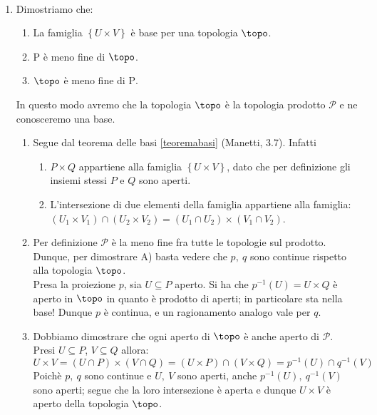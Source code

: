 \begin{demonstration}~{}
	\begin{enumerate}[label=\Roman*]
		\item Dimostriamo che:
		\begin{enumerate}[label=\Alph*)]
			\item La famiglia $\left\{U\times V\right\}$ è base per una topologia $\topo$.
			\item $\mathrm{P}$ è meno fine di $\topo$.
			\item $\topo$ è meno fine di $\mathrm{P}$.
		\end{enumerate}
		In questo modo avremo che la topologia $\topo$ è la topologia prodotto $\mathcal{P}$ e ne conosceremo una base.
		\begin{enumerate}[label=\alph*)]
			\item Segue dal teorema delle basi \ref{teoremabasi} (Manetti, 3.7). Infatti
			\begin{enumerate}
				\item $P\times Q$ appartiene alla famiglia $\left\{U\times V\right\}$, dato che per definizione gli insiemi stessi $P$ e $Q$ sono aperti.
				\item L'intersezione di due elementi della famiglia appartiene alla famiglia:
				$\left(U_1\times V_1\right)\cap\left(U_2\times V_2\right)=\left(U_1\cap U_2\right)\times \left(V_1\cap V_2\right)$.
			\end{enumerate}
			\item Per definizione $\mathcal{P}$ è la meno fine fra tutte le topologie sul prodotto. Dunque, per dimostrare A) basta vedere che $p,\ q$ sono continue rispetto alla topologia $\topo$.\\
			Presa la proiezione $p$, sia $U\subseteq P$ aperto. Si ha che $p^{-1}\left(U\right)=U\times Q$ è aperto in $\topo$ in quanto è prodotto di aperti; in particolare sta nella base! Dunque $p$ è continua, e un ragionamento analogo vale per $q$.
			\item Dobbiamo dimostrare che ogni aperto di $\topo$ è anche aperto di $\mathcal{P}$.\\
			Presi $U\subseteq P$, $V\subseteq Q$ allora:
			\begin{equation*}
				U\times V=\left(U\cap P\right)\times\left(V\cap Q\right)=\left(U\times P\right)\cap \left(V\times Q\right)=p^{-1}\left(U\right)\cap q^{-1}\left(V\right)
			\end{equation*}
			Poichè $p,\ q$ sono continue e $U,\ V$ sono aperti, anche $p^{-1}\left(U\right),\ q^{-1}\left(V\right)$ sono aperti; segue che la loro intersezione è aperta e dunque $U\times V$ è aperto della topologia $\topo$.

\end{enumerate}
\end{enumerate}
\end{demonstration}
